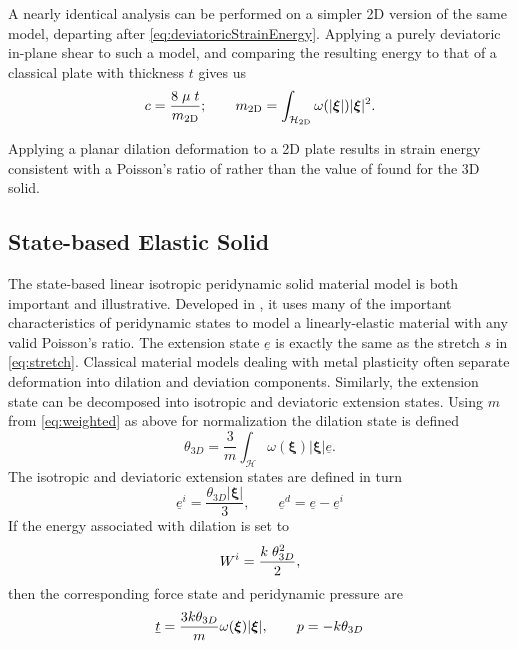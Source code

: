 A nearly identical analysis can be performed on a simpler 2D version of the same model, departing after \cref{eq:deviatoricStrainEnergy}.
Applying a purely deviatoric in-plane shear to such a model, and comparing the resulting energy to that of a classical plate with thickness $t$ gives us
%
\begin{equation}
c = \frac{8\;\mu\;t}{m_\textrm{2D}};\qquad m_\textrm{2D} =\int_\mathcal{H_\textrm{2D}}\omega(|\boldsymbol{\xi}|)|\boldsymbol{\xi}|^2.  \notag
\end{equation}
%

Applying a planar dilation deformation to a 2D plate results in strain energy consistent with a Poisson's ratio of  rather than the value of  found for the 3D solid.

\subsection{State-based Elastic Solid}
The state-based linear isotropic peridynamic solid material model is both important and illustrative.
Developed in \cite{silling2007peridynamic}, it uses many of the important characteristics of peridynamic states to model a linearly-elastic material with any valid Poisson's ratio.
The extension state $\underline{e}$ is exactly the same as the stretch $s$ in \cref{eq:stretch}.
Classical material models dealing with metal plasticity often separate deformation into dilation and deviation components.
Similarly, the extension state can be decomposed into isotropic and deviatoric extension states. Using $m$ from \cref{eq:weighted} as above for normalization the dilation state is defined
%
\begin{equation}
\theta_{3D} = \frac{3}{m} \int_\mathcal{H} \omega(\boldsymbol{\xi}) |\boldsymbol{\xi}| \underline{e}.
\end{equation}
%
The isotropic and deviatoric extension states are defined in turn
%
\begin{equation}
\underline{e}^i = \frac{\theta_{3D} |\boldsymbol{\xi}|}{3},\qquad \underline{e}^d = \underline{e}-\underline{e}^i
\end{equation}
%
If the energy associated with dilation is set to
%
\begin{equation}
W^i = \frac{k\;\theta^2_{3D}}{2},\notag
\end{equation}
%
then the corresponding force state and peridynamic pressure are
%
\begin{equation}
\underline{t} = \frac{3k\theta_{3D}}{m}\omega(\boldsymbol{\xi})|\boldsymbol{\xi}|,\qquad p=-k\theta_{3D}\notag
\end{equation}

